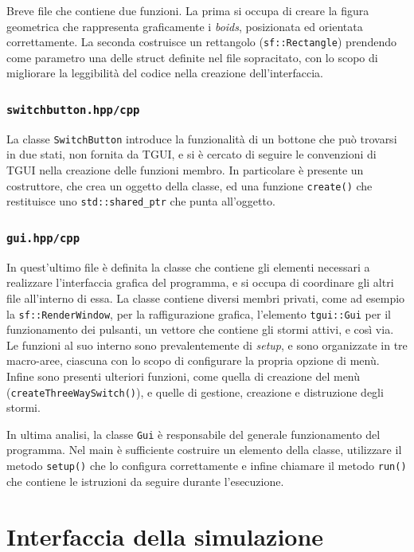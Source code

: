 \documentclass[10pt,a4paper]{article}
\begin{document}
Breve file che contiene due funzioni. La prima si occupa di creare la figura geometrica che rappresenta graficamente i \textit{boids}, posizionata ed orientata correttamente. La seconda costruisce un rettangolo (\texttt{sf::Rectangle}) prendendo come parametro una delle struct definite nel file sopracitato, con lo scopo di migliorare la leggibilità del codice nella creazione dell'interfaccia.

\subsubsection{\texttt{switchbutton.hpp/cpp}}

La classe \texttt{SwitchButton} introduce la funzionalità di un bottone che può trovarsi in due stati, non fornita da TGUI, e si è cercato di seguire le convenzioni di TGUI nella creazione delle funzioni membro. In particolare è presente un costruttore, che crea un oggetto della classe, ed una funzione \texttt{create()} che restituisce uno \texttt{std::shared\_ptr} che punta all'oggetto.

\subsubsection{\texttt{gui.hpp/cpp}}

In quest'ultimo file è definita la classe che contiene gli elementi necessari a realizzare l'interfaccia grafica del programma, e si occupa di coordinare gli altri file all'interno di essa. La classe contiene diversi membri privati, come ad esempio la \texttt{sf::RenderWindow}, per la raffigurazione grafica, l'elemento \texttt{tgui::Gui} per il funzionamento dei pulsanti, un vettore che contiene gli stormi attivi, e così via. Le funzioni al suo interno sono prevalentemente di \textit{setup}, e sono organizzate in tre macro-aree, ciascuna con lo scopo di configurare la propria opzione di menù. Infine sono presenti ulteriori funzioni, come quella di creazione del menù (\texttt{createThreeWaySwitch()}), e quelle di gestione, creazione e distruzione degli stormi.

In ultima analisi, la classe \texttt{Gui} è responsabile del generale funzionamento del programma. Nel main è sufficiente costruire un elemento della classe, utilizzare il metodo \texttt{setup()} che lo configura correttamente e infine chiamare il metodo \texttt{run()} che contiene le istruzioni da seguire durante l'esecuzione.

\newpage

\section{Interfaccia della simulazione}
\end{document}
